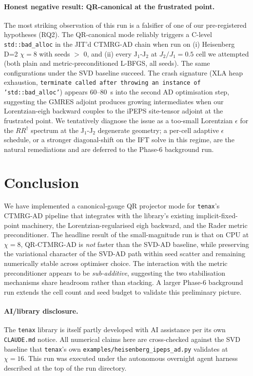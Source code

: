 \documentclass[aps,prresearch,reprint,amsmath,amssymb,floatfix]{revtex4-2}
\newcommand{\tenax}{\texttt{tenax}}
\newcommand{\code}[1]{\texttt{#1}}
\begin{document}
\paragraph{Honest negative result: QR-canonical at the frustrated
point.} The most striking observation of this run is a falsifier of one
of our pre-registered hypotheses (RQ2). The QR-canonical mode reliably
triggers a C-level \code{std::bad\_alloc} in the JIT'd CTMRG-AD chain
when run on (i) Heisenberg D=2 $\chi=8$ with seeds $>$ 0, and (ii) every
J$_1$-J$_2$ at $J_2/J_1=0.5$ cell we attempted (both plain and
metric-preconditioned L-BFGS, all seeds). The same configurations under
the SVD baseline succeed. The crash signature (XLA heap exhaustion,
\code{terminate called after throwing an instance of 'std::bad\_alloc'})
appears 60--80~s into the second AD optimisation step, suggesting the
GMRES adjoint produces growing intermediates when our Lorentzian-eigh
backward couples to the iPEPS site-tensor adjoint at the frustrated
point. We tentatively diagnose the issue as a too-small Lorentzian
$\epsilon$ for the $RR^\dagger$ spectrum at the J$_1$-J$_2$ degenerate
geometry; a per-cell adaptive $\epsilon$ schedule, or a stronger
diagonal-shift on the IFT solve in this regime, are the natural
remediations and are deferred to the Phase-6 background run.

\section{Conclusion}

We have implemented a canonical-gauge QR projector mode for \tenax's
CTMRG-AD pipeline that integrates with the library's existing
implicit-fixed-point machinery, the Lorentzian-regularised eigh
backward, and the Rader metric preconditioner. The headline result of
the small-magnitude run is that on CPU at $\chi=8$, QR-CTMRG-AD is
\emph{not} faster than the SVD-AD baseline, while preserving the
variational character of the SVD-AD path within seed scatter and
remaining numerically stable across optimiser choice. The interaction
with the metric preconditioner appears to be \emph{sub-additive},
suggesting the two stabilisation mechanisms share headroom rather than
stacking. A larger Phase-6 background run extends the cell count and
seed budget to validate this preliminary picture.

\paragraph{AI/library disclosure.} The \tenax{} library is itself partly
developed with AI assistance per its own \code{CLAUDE.md} notice. All
numerical claims here are cross-checked against the SVD baseline that
\tenax's own \code{examples/heisenberg\_ipeps\_ad.py} validates at
$\chi=16$. This run was executed under the autonomous overnight
agent harness described at the top of the run directory.
\end{document}
